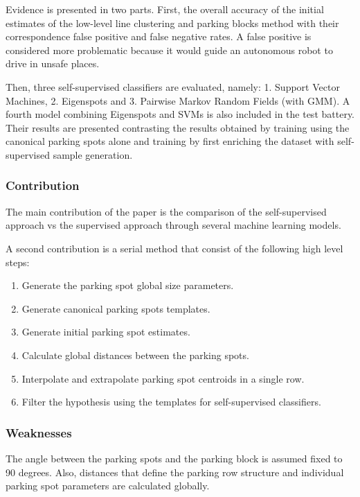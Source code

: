 \documentclass[]{article}
\providecommand{\tightlist}{%
  \setlength{\itemsep}{0pt}\setlength{\parskip}{0pt}}
\begin{document}
Evidence is presented in two parts. First, the overall accuracy of the initial estimates of the low-level line clustering and parking blocks method with their correspondence false positive and false negative rates. A false positive is considered more problematic because it would guide an autonomous robot to drive in unsafe places.

Then, three self-supervised classifiers are evaluated, namely: 1. Support Vector Machines, 2. Eigenspots and 3. Pairwise Markov Random Fields (with GMM). A fourth model combining Eigenspots and SVMs is also included in the test battery. Their results are presented contrasting the results obtained by training using the canonical parking spots alone and training by first enriching the dataset with self-supervised sample generation.

\hypertarget{contribution}{%
\subsubsection{Contribution}\label{contribution}}

The main contribution of the paper is the comparison of the self-supervised approach vs the supervised approach through several machine learning models.

A second contribution is a serial method that consist of the following high level steps:

\begin{enumerate}
\def\labelenumi{\arabic{enumi}.}
\tightlist
\item
  Generate the parking spot global size parameters.
\item
  Generate canonical parking spots templates.
\item
  Generate initial parking spot estimates.
\item
  Calculate global distances between the parking spots.
\item
  Interpolate and extrapolate parking spot centroids in a single row.
\item
  Filter the hypothesis using the templates for self-supervised classifiers.
\end{enumerate}

\hypertarget{weaknesses}{%
\subsubsection{Weaknesses}\label{weaknesses}}

The angle between the parking spots and the parking block is assumed fixed to 90 degrees.
Also, distances that define the parking row structure and individual parking spot parameters are calculated globally.
\end{document}
